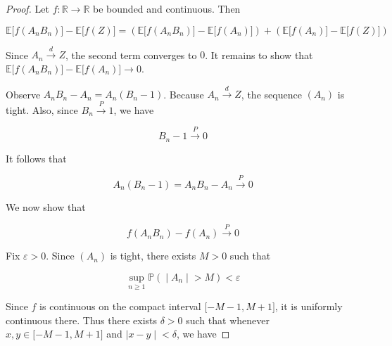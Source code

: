 \begin{proof}
Let \(\mathit{f}:\mathbb{R}\rightarrow\mathbb{R}\) be bounded and continuous. Then

\[\mathbb{E}\lbrack\mathit{f}(\mathit{A}_{\mathit{n}}\mathit{B}_{\mathit{n}})\rbrack - \mathbb{E}\lbrack\mathit{f}(\mathit{Z})\rbrack = (\mathbb{E}\lbrack\mathit{f}(\mathit{A}_{\mathit{n}}\mathit{B}_{\mathit{n}})\rbrack - \mathbb{E}\lbrack\mathit{f}(\mathit{A}_{\mathit{n}})\rbrack) + (\mathbb{E}\lbrack\mathit{f}(\mathit{A}_{\mathit{n}})\rbrack - \mathbb{E}\lbrack\mathit{f}(\mathit{Z})\rbrack)\]

Since \(\mathit{A}_{\mathit{n}}\overset{\mathit{d}}{\rightarrow}\mathit{Z}\), the second term converges to \(0\). It remains to show that \(\mathbb{E}\lbrack\mathit{f}(\mathit{A}_{\mathit{n}}\mathit{B}_{\mathit{n}})\rbrack - \mathbb{E}\lbrack\mathit{f}(\mathit{A}_{\mathit{n}})\rbrack\rightarrow 0\).

Observe \(\mathit{A}_{\mathit{n}}\mathit{B}_{\mathit{n}} - \mathit{A}_{\mathit{n}} = \mathit{A}_{\mathit{n}}(\mathit{B}_{\mathit{n}} - 1)\). Because \(\mathit{A}_{\mathit{n}}\overset{\mathit{d}}{\rightarrow}\mathit{Z}\), the sequence \((\mathit{A}_{\mathit{n}})\) is tight. Also, since \(\mathit{B}_{\mathit{n}}\overset{\mathit{P}}{\rightarrow}1\), we have

\[\mathit{B}_{\mathit{n}} - 1\overset{\mathit{P}}{\rightarrow}0\]

It follows that

\[\mathit{A}_{\mathit{n}}(\mathit{B}_{\mathit{n}} - 1) = \mathit{A}_{\mathit{n}}\mathit{B}_{\mathit{n}} - \mathit{A}_{\mathit{n}}\overset{\mathit{P}}{\rightarrow}0\]

We now show that

\[\mathit{f}(\mathit{A}_{\mathit{n}}\mathit{B}_{\mathit{n}}) - \mathit{f}(\mathit{A}_{\mathit{n}})\overset{\mathit{P}}{\rightarrow}0\]

Fix \(\mathit{\varepsilon} > 0\). Since \((\mathit{A}_{\mathit{n}})\) is tight, there exists \(\mathit{M} > 0\) such that

\[\left. \sup\limits_{\mathit{n} \geq 1}\mathbb{P}( \middle| \mathit{A}_{\mathit{n}} \middle| > \mathit{M}) < \mathit{\varepsilon} \right.\]

Since \(\mathit{f}\) is continuous on the compact interval \(\lbrack - \mathit{M} - 1,\mathit{M} + 1\rbrack\), it is uniformly continuous there. Thus there exists \(\mathit{\delta} > 0\) such that whenever \(\mathit{x},\mathit{y} \in \lbrack - \mathit{M} - 1,\mathit{M} + 1\rbrack\) and \(\left. |\mathit{x} - \mathit{y} \middle| < \mathit{\delta} \right.\), we have


\end{proof}
